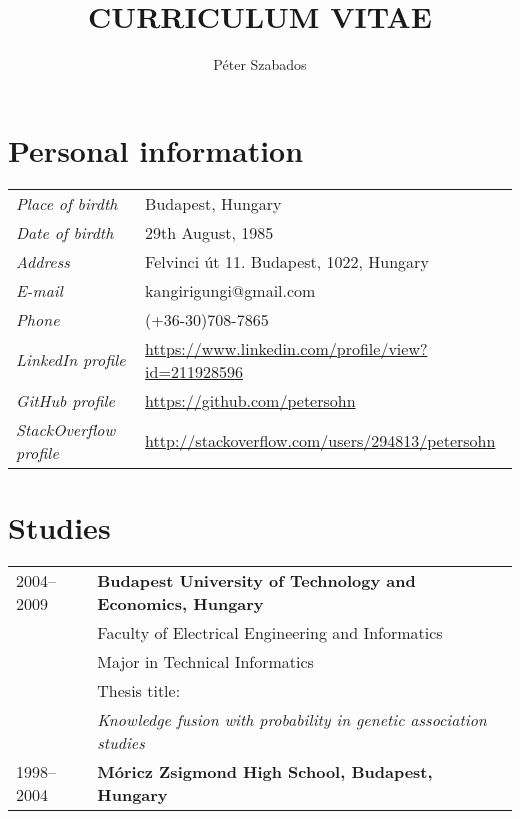 \documentclass[a4paper,10pt]{article}
\title{\textbf{CURRICULUM VITAE}}
\author{Péter Szabados}
\newcommand{\pont}[1]{\emph{#1}}
\begin{document}
\maketitle

\section*{Personal information}
\begin{tabular}{ll}
 \pont{Place of birdth}&Budapest, Hungary\\
 \pont{Date of birdth}&29th August, 1985\\
 \pont{Address}&Felvinci út 11. Budapest, 1022, Hungary\\
 \pont{E-mail}&kangirigungi@gmail.com\\
 \pont{Phone}&(+36-30)708-7865\\
 \pont{LinkedIn profile}&\href{https://www.linkedin.com/profile/view?id=211928596}{https://www.linkedin.com/profile/view?id=211928596}\\
 \pont{GitHub profile}&\href{https://github.com/petersohn}{https://github.com/petersohn}\\
 \pont{StackOverflow profile}&\href{http://stackoverflow.com/users/294813/petersohn}{http://stackoverflow.com/users/294813/petersohn}\\
\end{tabular}

\section*{Studies}
\begin{tabular}{ll}
 2004--2009
  &\textbf{Budapest University of Technology and Economics, Hungary}\\
  &Faculty of Electrical Engineering and Informatics\\
  &Major in Technical Informatics\\
  &Thesis title:\\
  &\emph{Knowledge fusion with probability in genetic association studies}\\
  1998--2004&\textbf{Móricz Zsigmond High School, Budapest, Hungary}
\end{tabular}
\end{document}
